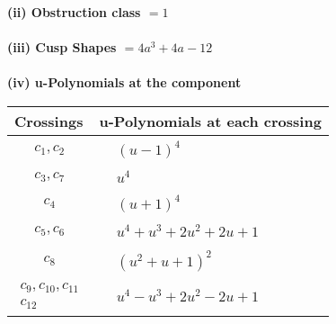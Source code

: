 \documentclass[1p]{elsarticle_modified}
\theoremstyle{definition}
\begin{document}
\flushleft \textbf{(ii) Obstruction class $= 1$}\\~\\
\flushleft \textbf{(iii) Cusp Shapes $= 4 a^3+4 a-12$}\\~\\
\newpage\renewcommand{\arraystretch}{1}
\flushleft \textbf{(iv) u-Polynomials at the component}\newline \\
\begin{tabular}{m{50pt}|m{274pt}}
Crossings & \hspace{64pt}u-Polynomials at each crossing \\
\hline $$\begin{aligned}c_{1},c_{2}\end{aligned}$$&$\begin{aligned}
&(u-1)^4
\end{aligned}$\\
\hline $$\begin{aligned}c_{3},c_{7}\end{aligned}$$&$\begin{aligned}
&u^4
\end{aligned}$\\
\hline $$\begin{aligned}c_{4}\end{aligned}$$&$\begin{aligned}
&(u+1)^4
\end{aligned}$\\
\hline $$\begin{aligned}c_{5},c_{6}\end{aligned}$$&$\begin{aligned}
&u^4+u^3+2 u^2+2 u+1
\end{aligned}$\\
\hline $$\begin{aligned}c_{8}\end{aligned}$$&$\begin{aligned}
&(u^2+u+1)^2
\end{aligned}$\\
\hline $$\begin{aligned}c_{9},c_{10},c_{11}\\c_{12}\end{aligned}$$&$\begin{aligned}
&u^4- u^3+2 u^2-2 u+1
\end{aligned}$\\
\hline
\end{tabular}\\~\\
\end{document}
